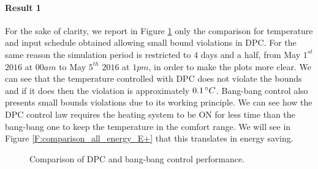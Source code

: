 \paragraph{Result 1} For the sake of clarity, we report in Figure \ref{F:comparison_small} only the comparison for temperature and input schedule obtained allowing small bound violations in DPC.  For the same reason the simulation period is restricted to $4$ days and a half, from May $1^{st}$ $2016$ at $00am$ to May $5^{th}$ $2016$ at $1pm$, in order to make the plots more clear. We can see that the temperature controlled with DPC does not violate the bounds and if it does then the violation is approximately $0.1\,\degree C$. Bang-bang control also presents small bounds violations due to its working principle. We can see how the DPC control law requires the heating system to be ON for less time than the bang-bang one to keep the temperature in the comfort range. We will see in Figure \ref{F:comparison_all_energy_E+} that this translates in energy saving.

\begin{figure}[t!]
	\begin{center}
	\end{center}
	\caption{Comparison of DPC and bang-bang control performance.}
	\captionsetup{justification=centering}
	\label{F:comparison_small}
\end{figure}

